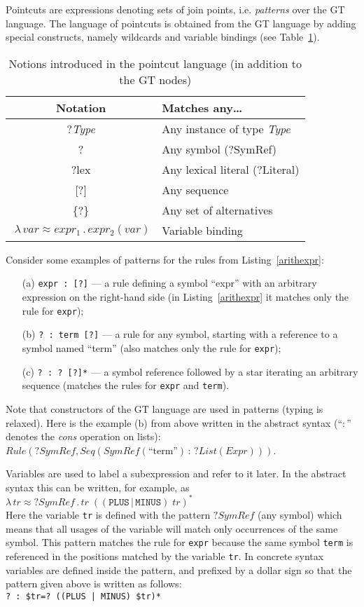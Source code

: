 \documentclass{IOS-Book-Article}     %
\newcommand{\abstr}[3]{\lambda \, #1 \approx #2 \,.\, #3}
\newcommand{\tabref}[1]{Table~\ref{#1}}
\newcommand{\lstref}[1]{Listing~\ref{#1}}
\begin{document}
Pointcuts are expressions denoting sets of join points, i.e. \emph{patterns} over the GT language. The language of pointcuts is obtained from the GT language by adding special constructs, namely wildcards and variable bindings (see \tabref{wildcards}).
%
\begin{table}[h!]
\centering
\begin{tabular}{|@{}c|l|}
	\hline
	\bf Notation & \bf Matches any\ldots \\
	\hline
	?\emph{Type} & Any instance of type \emph{Type} \\
	? & Any symbol (?SymRef)\\
	?lex & Any lexical literal (?Literal) \\
	{}[?]& Any sequence \\
	\{?\}& Any set of alternatives \\
	$\;\abstr{var}{expr_1}{expr_2(var)}$ & Variable binding \\
	\hline
\end{tabular}
\caption{Notions introduced in the pointcut language (in addition to the GT nodes)}\label{wildcards}
\end{table}
%
Consider some examples of patterns for the rules from \lstref{arithexpr}:
\begin{itemize}
	\item[(a)] \lstinline!expr : [?]! --- a rule defining a symbol ``expr'' with an arbitrary expression on the right-hand side (in \lstref{arithexpr} it matches only the rule for \texttt{expr});
	\item[(b)] \lstinline!? : term [?]! --- a rule for any symbol, starting with a reference to a symbol named ``term'' (also matches only the rule for \texttt{expr});
	\item[(c)] \lstinline!? : ? [?]*! --- a symbol reference followed by a star iterating an arbitrary sequence (matches the rules for \texttt{expr} and \texttt{term}).
\end{itemize}
Note that constructors of the GT language are used in patterns (typing is relaxed). Here is the example (b) from above written in the abstract syntax (``$:$'' denotes the \emph{cons} operation on lists):
 $Rule(?SymRef, Seq(SymRef(\mbox{``term''})\,:\,?List(Expr)))$.

Variables are used to label a subexpression and refer to it later. In the abstract syntax this can be written, for example, as\\
\indent
$
\abstr{tr}{?SymRef}{tr\;((\mathtt{PLUS} \,|\, \mathtt{MINUS})\; tr)^*}
$\\
Here the variable \texttt{tr} is defined with the pattern $?SymRef$ (any symbol) which means that all usages of the variable will match only occurrences of the same symbol. This pattern matches the rule for \texttt{expr} because the same symbol \texttt{term} is referenced in the positions matched by the variable \texttt{tr}. In concrete syntax variables are defined inside the pattern, and prefixed by a dollar sign so that the pattern given above is written as follows:\\
\indent\lstinline!? : $tr=? ((PLUS | MINUS) $tr)*!
\end{document}
